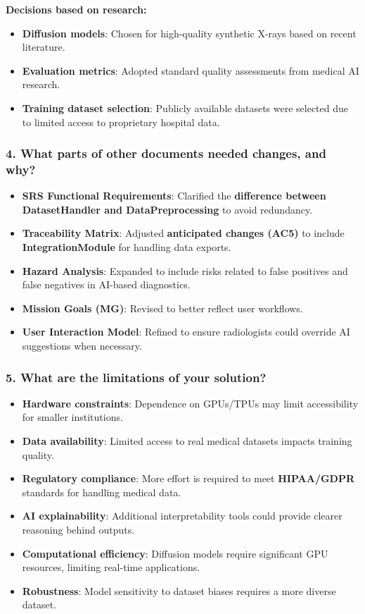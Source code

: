 \documentclass[12pt, titlepage]{article}
\begin{document}
\textbf{Decisions based on research:}
\begin{itemize}
    \item \textbf{Diffusion models}: Chosen for high-quality synthetic X-rays based on recent literature.
    \item \textbf{Evaluation metrics}: Adopted standard quality assessments from medical AI research.
    \item \textbf{Training dataset selection}: Publicly available datasets were selected due to limited access to proprietary hospital data.
\end{itemize}

\subsubsection{4. What parts of other documents needed changes, and why?}
\begin{itemize}
    \item \textbf{SRS Functional Requirements}: Clarified the \textbf{difference between DatasetHandler and DataPreprocessing} to avoid redundancy.
    \item \textbf{Traceability Matrix}: Adjusted \textbf{anticipated changes (AC5)} to include \textbf{IntegrationModule} for handling data exports.
    \item \textbf{Hazard Analysis}: Expanded to include risks related to false positives and false negatives in AI-based diagnostics.
    \item \textbf{Mission Goals (MG)}: Revised to better reflect user workflows.
    \item \textbf{User Interaction Model}: Refined to ensure radiologists could override AI suggestions when necessary.
\end{itemize}

\subsubsection{5. What are the limitations of your solution?}
\begin{itemize}
    \item \textbf{Hardware constraints}: Dependence on GPUs/TPUs may limit accessibility for smaller institutions.
    \item \textbf{Data availability}: Limited access to real medical datasets impacts training quality.
    \item \textbf{Regulatory compliance}: More effort is required to meet \textbf{HIPAA/GDPR} standards for handling medical data.
    \item \textbf{AI explainability}: Additional interpretability tools could provide clearer reasoning behind outputs.
    \item \textbf{Computational efficiency}: Diffusion models require significant GPU resources, limiting real-time applications.
    \item \textbf{Robustness}: Model sensitivity to dataset biases requires a more diverse dataset.
\end{itemize}
\end{document}
